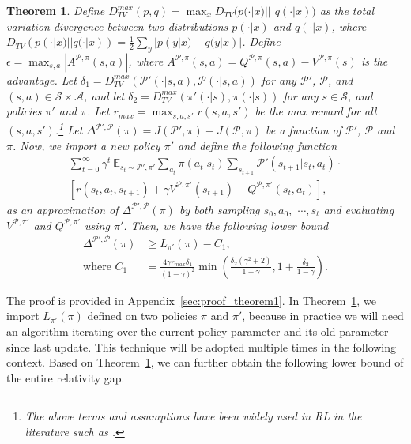 \documentclass[letterpaper]{article} %
\def\E{{\mathbb{E}}}
\def\P{{\mathcal{P}}}
\def\A{{\mathcal{A}}}
\def\S{{\mathcal{S}}}
\newtheorem{theorem}{Theorem}%
\begin{document}
\begin{theorem}
\label{theo:2}
Define $D_{TV}^{max}(p,q)=\max_{x}D_{TV}(p(\cdot|x)||$ $q(\cdot|x))$ as the total variation divergence between two distributions $p(\cdot|x)$ and $q(\cdot|x)$, 
where $D_{TV}(p(\cdot|x)||q(\cdot|x))=\frac{1}{2}\sum_{y}|p(y|x)-q(y|x)|$. 
Define $\epsilon=\max_{s,a}|A^{\P,\pi}(s,a)|$, where $A^{\P,\pi}(s,a)=Q^{\P,\pi}(s,a)-V^{\P,\pi}(s)$ is the advantage. 
Let $\delta_1=D_{TV}^{max}(\P'(\cdot|s,a),\P(\cdot|s,a))$
for any $\P'$, $\P$, and $(s,a)\in\S\times\A$, and let 
$\delta_2=D_{TV}^{max}(\pi'(\cdot|s),\pi(\cdot|s))$
for any $s\in\S$, and policies $\pi'$ and $\pi$. Let $r_{max}=\max_{s,a,s'}r(s,a,s')$ be the max reward for all $(s,a,s')$.\footnote{The above terms and assumptions have been widely used in RL in the literature such as \citep{kakade2002,schulman2015trust,luo2018algorithmic,janner2019trust}.}
Let $\Delta^{\P',\P}(\pi)=J(\P',\pi)-J(\P,\pi)$ be a function of $\P'$, $\P$ and $\pi$. 
Now, we import a new policy $\pi'$ and define the following function
{\small
\begin{align}
\sum_{t=0}^{\infty}\gamma^t\ 
\E_{s_t\sim \P',\pi'}
\sum_{a_t}\pi(a_t|s_t)
\sum_{s_{t+1}}\P'(s_{t+1}|s_t,a_t)  \cdot \nonumber \\
\left[
r(s_t,a_t,s_{t+1})+\gamma V^{\P, \pi'}(s_{t+1}) - Q^{\P, {\pi'}}(s_t,a_t)
\right],
\end{align}
}as an approximation of $\Delta^{\P',\P}(\pi)$ by both sampling $s_0,a_0,$ $\cdots,s_t$ and evaluating $V^{\P,\pi'}$ and $Q^{\P,\pi'}$ using $\pi'$. Then, we have the following lower bound
{\small
\begin{equation}
\begin{aligned}
\Delta^{\P',\P}(\pi)&\geq L_{\pi'}(\pi)-C_1, \\
\text{where }
C_1&=\frac{4\gamma r_{max}\delta_1}{(1-\gamma)^2}
\min\left(
\frac{\delta_2(\gamma^2+2)}{1-\gamma}, 1+\frac{\delta_2}{1-\gamma}
\right).
\label{eq:lower}
\end{aligned}
\end{equation}
}
\end{theorem}
The proof is provided in Appendix~\ref{sec:proof_theorem1}. In Theorem~\ref{theo:2}, we import $L_{\pi'}(\pi)$ defined on two policies $\pi$ and $\pi'$, because in practice we will need an algorithm iterating over the current policy parameter and its old parameter since last update. This technique will be adopted multiple times in the following context. Based on Theorem~\ref{theo:2}, we can further obtain the following lower bound of the entire relativity gap.
\end{document}
